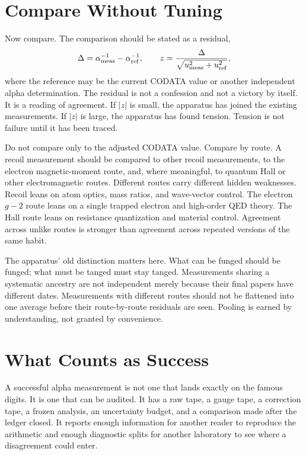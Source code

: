 \section{Compare Without Tuning}

Now compare. The comparison should be stated as a residual,
\[
  \Delta =
  \alpha^{-1}_{\rm meas} - \alpha^{-1}_{\rm ref},
  \qquad
  z =
  \frac{\Delta}{\sqrt{u_{\rm meas}^2+u_{\rm ref}^2}},
\]
where the reference may be the current CODATA value or another independent alpha determination. The residual is
not a confession and not a victory by itself. It is a reading of agreement. If \(|z|\) is small, the apparatus
has joined the existing measurements. If \(|z|\) is large, the apparatus has found tension. Tension is not
failure until it has been traced.

Do not compare only to the adjusted CODATA value. Compare by route. A recoil measurement should be compared to
other recoil measurements, to the electron magnetic-moment route, and, where meaningful, to quantum Hall or other
electromagnetic routes. Different routes carry different hidden weaknesses. Recoil leans on atom optics, mass
ratios, and wave-vector control. The electron \(g-2\) route leans on a single trapped electron and high-order QED
theory. The Hall route leans on resistance quantization and material control. Agreement across unlike routes is
stronger than agreement across repeated versions of the same habit.

The apparatus' old distinction matters here. What can be funged should be funged; what must be tanged must stay
tanged. Measurements sharing a systematic ancestry are not independent merely because their final papers have
different dates. Measurements with different routes should not be flattened into one average before their
route-by-route residuals are seen. Pooling is earned by understanding, not granted by convenience.

\section{What Counts as Success}

A successful alpha measurement is not one that lands exactly on the famous digits. It is one that can be audited.
It has a raw tape, a gauge tape, a correction tape, a frozen analysis, an uncertainty budget, and a comparison
made after the ledger closed. It reports enough information for another reader to reproduce the arithmetic and
enough diagnostic splits for another laboratory to see where a disagreement could enter.

